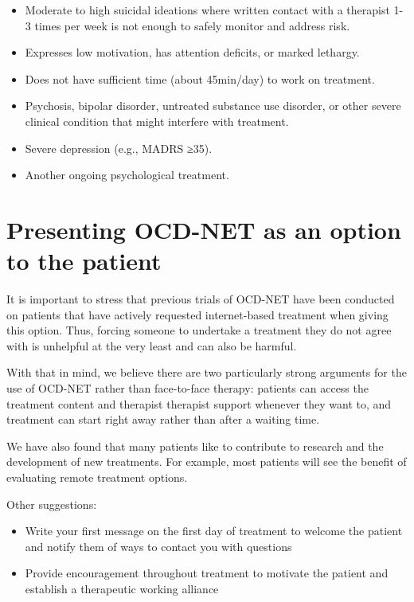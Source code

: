 \documentclass[]{book}
\providecommand{\tightlist}{%
  \setlength{\itemsep}{0pt}\setlength{\parskip}{0pt}}
\theoremstyle{definition}
\theoremstyle{definition}
\theoremstyle{definition}
\theoremstyle{remark}
\begin{document}
\begin{itemize}
\tightlist
\item
  Moderate to high suicidal ideations where written contact with a
  therapist 1-3 times per week is not enough to safely monitor and
  address risk.\\
\item
  Expresses low motivation, has attention deficits, or marked
  lethargy.\\
\item
  Does not have sufficient time (about 45min/day) to work on
  treatment.\\
\item
  Psychosis, bipolar disorder, untreated substance use disorder, or
  other severe clinical condition that might interfere with treatment.\\
\item
  Severe depression (e.g., MADRS ≥35).\\
\item
  Another ongoing psychological treatment.
\end{itemize}

\hypertarget{presenting-ocd-net-as-an-option-to-the-patient}{%
\section{Presenting OCD-NET as an option to the
patient}\label{presenting-ocd-net-as-an-option-to-the-patient}}

It is important to stress that previous trials of OCD-NET have been
conducted on patients that have actively requested internet-based
treatment when giving this option. Thus, forcing someone to undertake a
treatment they do not agree with is unhelpful at the very least and can
also be harmful.

With that in mind, we believe there are two particularly strong
arguments for the use of OCD-NET rather than face-to-face therapy:
patients can access the treatment content and therapist therapist
support whenever they want to, and treatment can start right away rather
than after a waiting time.

We have also found that many patients like to contribute to research and
the development of new treatments. For example, most patients will see
the benefit of evaluating remote treatment options.

Other suggestions:

\begin{itemize}
\tightlist
\item
  Write your first message on the first day of treatment to welcome the
  patient and notify them of ways to contact you with questions
\item
  Provide encouragement throughout treatment to motivate the patient and
  establish a therapeutic working alliance
\end{itemize}
\end{document}
